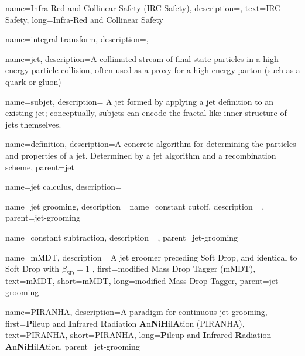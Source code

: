 {
    name=Infra-Red and Collinear Safety (IRC Safety),
    description={},
    text={IRC Safety},
    long={Infra-Red and Collinear Safety}
}


{
    name=integral transform,
    description={},
}



{
  name=jet,
  description={A collimated stream of final-state particles in a high-energy particle collision, often used as a proxy for a high-energy parton (such as a quark or gluon)}
}

{
  name=subjet,
  description={
      A jet formed by applying a jet definition to an existing jet;
      conceptually, subjets can encode the fractal-like inner structure of jets themselves.
  }
}



{
    name=definition,
    description={A concrete algorithm for determining the particles and properties of a jet.
    Determined by a jet algorithm and a recombination scheme},
    parent=jet
}



{
  name=jet calculus,
  description={}
}



{
  name=jet grooming,
  description={}
}
    {
        name=constant cutoff,
        description={
        },
        parent=jet-grooming
    }

    {
        name=constant subtraction,
        description={
        },
        parent=jet-grooming
    }

    {
        name=mMDT,
        description={
            A jet groomer preceding Soft Drop, and identical to Soft Drop with \(\beta_\text{SD}=1\)
       },
        first={modified Mass Drop Tagger (mMDT)},
        text={mMDT},
        short={mMDT},
        long={modified Mass Drop Tagger},
        parent=jet-grooming
    }


    {
        name=\textsc{PIRANHA},
        description={A paradigm for continuous jet grooming},
        first={\textbf{P}ileup and \textbf{I}nfrared \textbf{R}adiation \textbf{A}n\textbf{N}i\textbf{H}il\textbf{A}tion (\textsc{PIRANHA})},
        text={\textsc{PIRANHA}},
        short={\textsc{PIRANHA}},
        long={\textbf{P}ileup and \textbf{I}nfrared \textbf{R}adiation \textbf{A}n\textbf{N}i\textbf{H}il\textbf{A}tion},
        parent=jet-grooming
    }


